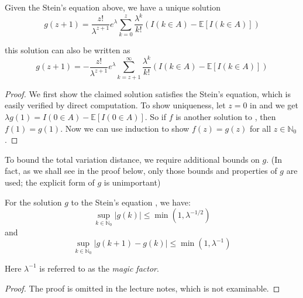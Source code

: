 \documentclass{article}
\begin{document}
\begin{lemma}\label{lem:poisson_stein_equation}
    Given the Stein's equation above, we have a unique solution
    \begin{equation}
        g(z+1) = \frac{z!}{\lambda^{z+1}} e^\lambda \sum_{k=0}^z \frac{\lambda^k}{k!} (I(k\in A) - \mathbb{E}[I(k\in A)])
    \end{equation}

    this solution can also be written as 
    \begin{equation}
        g(z+1) = -\frac{z!}{\lambda^{z+1}} e^\lambda \sum_{k=z+1}^\infty \frac{\lambda^k}{k!} (I(k\in A) - \mathbb{E}[I(k\in A)])
    \end{equation}
\end{lemma}

\begin{proof}
    We first show the claimed solution satisfies the Stein's equation, which is easily verified by direct computation. To show uniqueness, let $z=0$ in  and we get $\lambda g(1) = I(0\in A) - \mathbb{E}[I(0\in A)]$. So if $f$ is another solution to , then $f(1)=g(1)$. Now we can use induction to show $f(z)=g(z)$ for all $z\in \mathbb{N}_0$.
\end{proof}

To bound the total variation distance, we require additional bounds on $g$.  (In fact, as we shall see in the proof below, only those bounds and properties of $g$ are used; the explicit form of $g$ is unimportant)

\begin{lemma}\label{lem:poisson_stein_bound}
For the solution $g$ to the Stein's equation , we have:
\begin{equation}
    \sup_{k \in \mathbb{N}_0} |g(k)| \leq \min (1, \lambda^{-1/2})
    \label{eq:poisson_stein_bound1}
\end{equation}
and 
\begin{equation}
    \sup_{k \in \mathbb{N}_0} |g(k+1) - g(k)| \leq \min (1, \lambda^{-1})
    \label{eq:poisson_stein_bound2}
\end{equation}

Here $\lambda^{-1}$ is referred to as the \textit{magic factor}.
\end{lemma}

\begin{proof}
    The proof is omitted in the lecture notes, which is not examinable. 
\end{proof}
\end{document}
